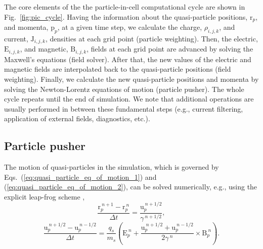 \documentclass[10pt, a4paper, twoside, openright]{report}
\renewcommand{\vec}[1]{\boldsymbol{\mathrm{#1}}}
\begin{document}

The core elements of the the particle-in-cell computational cycle are shown in Fig.~\ref{fig:pic_cycle}. Having the information about the quasi-particle positions, $ \vec{r}_p $, and momenta, $ \vec{p}_p $, at a given time step, we calculate the charge, $ \rho_{i, j, k} $, and current, $ \vec{J}_{i, j, k} $, densities at each grid point (particle weighting). Then, the electric, $ \vec{E}_{i,j,k} $, and magnetic, $ \vec{B}_{i, j, k} $, fields at each grid point are advanced by solving the Maxwell's equations (field solver). After that, the new values of the electric and magnetic fields are interpolated back to the quasi-particle positions (field weighting). Finally, we calculate the new quasi-particle positions and momenta by solving the Newton-Lorentz equations of motion (particle pusher). The whole cycle repeats until the end of simulation. We note that additional operations are usually performed in between these fundamental steps (e.g., current filtering, application of external fields, diagnostics, etc.).


\subsection{Particle pusher}

The motion of quasi-particles in the simulation, which is governed by Eqs.~(\ref{eq:quasi_particle_eq_of_motion_1}) and (\ref{eq:quasi_particle_eq_of_motion_2}), can be solved numerically, e.g., using the explicit leap-frog scheme \cite{Press2007},
\begin{equation}\label{eq:particle_pusher_eq_1}
	\frac{\vec{r}_{p}^{\:n+1} - \vec{r}_{p}^{\:n}}{\Delta t} = \frac{\vec{u}_{p}^{\:n + 1/2}}{\gamma^{\:n+1/2}},
\end{equation}
\begin{equation}\label{eq:particle_pusher_eq_2}
	\frac{\vec{u}_{p}^{\:n+1/2} - \vec{u}_{p}^{\:n-1/2}}{\Delta t} = \frac{q_{s}}{m_{s}} \left( \vec{E}_{p}^{\:n} + \frac{\vec{u}_{p}^{\:n+1/2} + \vec{u}_{p}^{\:n-1/2}}{2 \gamma^{\:n}} \times \vec{B}_{p}^{\:n} \right).
\end{equation}
\end{document}
